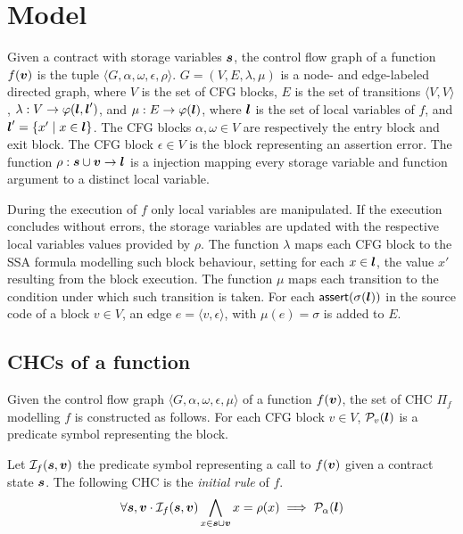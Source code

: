 \newpage
\section{Model}

Given a contract with storage variables $\boldsymbol{s}$,
the control flow graph of a function $f(\boldsymbol{v})$ 
is the tuple \mbox{$\langle G,\alpha,\omega,\epsilon,\rho\rangle$}.
\mbox{$G=(V,E,\lambda,\mu)$} 
is a node- and edge-labeled directed graph,
where $V$ is the set of CFG blocks, $E$ is the set of transitions 
$\langle V,V\rangle$,
\mbox{$\lambda:V\rightarrow\varphi(\boldsymbol{l},
\boldsymbol{l}')$}, and \mbox{$\mu:E\rightarrow\varphi(\boldsymbol{l})$},
where $\boldsymbol{l}$ is the set of local 
variables of $f$, and \mbox{$\boldsymbol{l}'=\{x'\mid x\in\boldsymbol{l}\}$}. 
The CFG blocks $\alpha,\omega\in V$ are respectively the entry 
block and exit block. The CFG block $\epsilon\in V$ is the block
representing an assertion error.
The function \mbox{$\rho:\boldsymbol{s}\cup\boldsymbol{v}\rightarrow\boldsymbol{l}$} is 
a injection mapping every storage variable and function 
argument to a distinct local variable. 

During the execution of $f$ only local variables are manipulated. If
the execution concludes without errors, the storage variables
are updated with the respective local variables values
provided by $\rho$.
%
The function $\lambda$ maps each CFG block to 
the SSA formula modelling such block behaviour, setting for each 
$x\in\boldsymbol{l}$, the value $x'$ resulting from the block
execution.
The function $\mu$ maps each transition to the condition 
under which such transition is taken.
For each \mbox{$\mathsf{assert}(\sigma(\boldsymbol{l}))$} in the 
source code of a block $v\in V$, an edge 
\mbox{$e=\langle v,\epsilon\rangle$}, with \mbox{$\mu(e)=\sigma$}
is added to $E$.

\subsection{CHCs of a function}
Given the control flow graph 
\mbox{$\langle G,\alpha,\omega,\epsilon,\mu\rangle$} 
of a function $f(\boldsymbol{v})$, the set of CHC $\Pi_f$ modelling $f$ 
is constructed
as follows. 
%
For each CFG block $v\in V$, $\mathcal{P}_v(\boldsymbol{l})$ 
is a predicate symbol representing the block.

Let $\mathcal{I}_f(\boldsymbol{s},\boldsymbol{v})$ the predicate symbol
representing a call to $f(\boldsymbol{v})$ given a contract state $\boldsymbol{s}$.
The following CHC is the {\em initial rule} of $f$.
\begin{align}
\label{eq:CHC-initial}
\forall\svar,\farg\cdot\inP_f(\svar,\farg)\bigwedge_{x\in\svar\cup\farg}x=\rho(x)\implies\pred_\alpha(\lvar)
\end{align}

